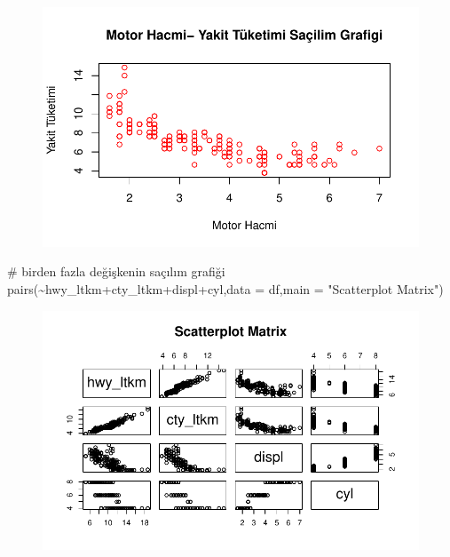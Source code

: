 \documentclass[
  letterpaper,
  DIV=11,
  numbers=noendperiod]{scrreprt}
\newenvironment{Shaded}{\begin{snugshade}}{\end{snugshade}}
\newcommand{\AttributeTok}[1]{\textcolor[rgb]{0.40,0.45,0.13}{#1}}
\newcommand{\CommentTok}[1]{\textcolor[rgb]{0.37,0.37,0.37}{#1}}
\newcommand{\FunctionTok}[1]{\textcolor[rgb]{0.28,0.35,0.67}{#1}}
\newcommand{\NormalTok}[1]{\textcolor[rgb]{0.00,0.23,0.31}{#1}}
\newcommand{\SpecialCharTok}[1]{\textcolor[rgb]{0.37,0.37,0.37}{#1}}
\newcommand{\StringTok}[1]{\textcolor[rgb]{0.13,0.47,0.30}{#1}}
\begin{document}
\begin{figure}[H]

{\centering \includegraphics{data_analysis_files/figure-pdf/unnamed-chunk-2-8.pdf}

}

\end{figure}

\begin{Shaded}
\begin{Highlighting}[]
\CommentTok{\# birden fazla değişkenin saçılım grafiği}
\FunctionTok{pairs}\NormalTok{(}\SpecialCharTok{\textasciitilde{}}\NormalTok{hwy\_ltkm}\SpecialCharTok{+}\NormalTok{cty\_ltkm}\SpecialCharTok{+}\NormalTok{displ}\SpecialCharTok{+}\NormalTok{cyl,}\AttributeTok{data =}\NormalTok{ df,}\AttributeTok{main =} \StringTok{"Scatterplot Matrix"}\NormalTok{)}
\end{Highlighting}
\end{Shaded}

\begin{figure}[H]

{\centering \includegraphics{data_analysis_files/figure-pdf/unnamed-chunk-2-9.pdf}

}

\end{figure}
\end{document}
